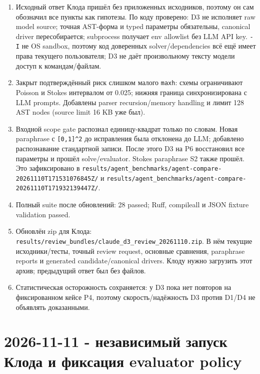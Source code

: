 \documentclass[11pt,a4paper]{article}
\begin{document}
\begin{enumerate}
    \item Исходный ответ Клода пришёл без приложенных исходников, поэтому он сам обозначил все пункты как гипотезы. По коду проверено: D3 не исполняет raw model source; точная AST-форма и typed параметры обязательны, canonical driver пересобирается; subprocess получает env allowlist без LLM API key. \texttt{-I} не OS sandbox, поэтому код доверенных solver/dependencies всё ещё имеет права текущего пользователя; D3 не даёт произвольному тексту модели доступ к командам/файлам.
    \item Закрыт подтверждённый риск слишком малого \texttt{maxh}: схемы ограничивают Poisson и Stokes интервалом от 0.025; нижняя граница синхронизирована с LLM prompts. Добавлены parser recursion/memory handling и лимит 128 AST nodes (source limit 16 KB уже был).
    \item Входной scope gate распознал единицу-квадрат только по словам. Новая paraphrase с \texttt{[0,1]\^{}2} до исправления была отклонена до LLM; добавлено распознавание стандартной записи. После этого D3 на P6 восстановил все параметры и прошёл solve/evaluator. Stokes paraphrase S2 также прошёл. Это зафиксировано в \texttt{results/agent\_benchmarks/agent-compare-20261110T171531076845Z/} и \texttt{results/agent\_benchmarks/agent-compare-20261110T171932139447Z/}.
    \item Полный suite после обновлений: 28 passed; Ruff, compileall и JSON fixture validation passed.
    \item Обновлён zip для Клода: \texttt{results/review\_bundles/claude\_d3\_review\_20261110.zip}. В нём текущие исходники/тесты, точный review request, основные сравнения, paraphrase reports и generated candidate/canonical drivers. Клоду нужно загрузить этот архив; предыдущий ответ был без файлов.
    \item Статистическая осторожность сохраняется: у D3 пока нет повторов на фиксированном кейсе P4, поэтому скорость/надёжность D3 против D1/D4 не объявлять доказанными.
\end{enumerate}

\section{2026-11-11 - независимый запуск Клода и фиксация evaluator policy}
\end{document}
